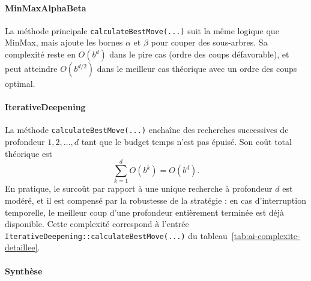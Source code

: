 \documentclass[a4paper]{article}
\begin{document}
\paragraph{MinMaxAlphaBeta}
La méthode principale \texttt{calculateBestMove(...)} suit la même logique que MinMax,
mais ajoute les bornes $\alpha$ et $\beta$ pour couper des sous-arbres.
Sa complexité reste en $O(b^d)$ dans le pire cas (ordre des coups défavorable),
et peut atteindre $O(b^{d/2})$ dans le meilleur cas théorique avec un ordre des coups optimal.

\paragraph{IterativeDeepening}
La méthode \texttt{calculateBestMove(...)} enchaîne des recherches successives de profondeur
$1,2,\dots,d$ tant que le budget temps n'est pas épuisé. Son coût total théorique est
$$\sum_{k=1}^{d} O(b^k) = O(b^d).$$
En pratique, le surcoût par rapport à une unique recherche à profondeur $d$ est modéré,
et il est compensé par la robustesse de la stratégie : en cas d'interruption temporelle,
le meilleur coup d'une profondeur entièrement terminée est déjà disponible.
Cette complexité correspond à l'entrée \texttt{IterativeDeepening::calculateBestMove(...)} du tableau~\ref{tab:ai-complexite-detaillee}.

\paragraph{Synthèse}
\end{document}
